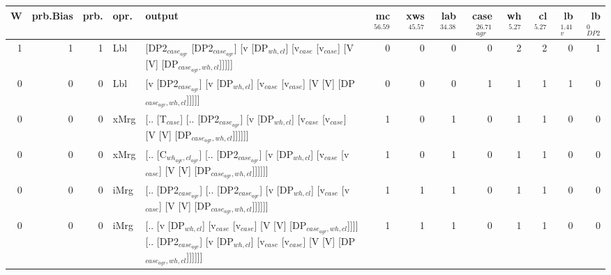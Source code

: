 \begin{tabularx}{\linewidth}{rrrlXrrrrrrrr}
\hline
   W &   prb.Bias &   prb. & opr.   & output                                                                                                                                             &   mc$^{56.59}$ &   xws$^{45.57}$ &   lab$^{34.38}$ &   case$_{agr}^{26.71}$ &   wh$^{5.27}$ &   cl$^{5.27}$ &   lb$_{v}^{1.41}$ &   lb$_{DP2}^{0}$ \\
\hline
   1 &       1 &   1 & Lbl  & [DP2$_{case_{agr}}$ [DP2$_{case_{agr}}$] [v [DP$_{wh,cl}$] [v$_{case}$ [v$_{case}$] [V [V] [DP$_{case_{agr},wh,cl}$]]]]]                                                         &            0 &             0 &             0 &                  0 &           2 &           2 &             0 &            1 \\
   0 &       0 &   0 & Lbl  & [v [DP2$_{case_{agr}}$] [v [DP$_{wh,cl}$] [v$_{case}$ [v$_{case}$] [V [V] [DP$_{case_{agr},wh,cl}$]]]]]                                                                    &            0 &             0 &             0 &                  1 &           1 &           1 &             1 &            0 \\
   0 &       0 &   0 & xMrg & [.. [T$_{case}$] [.. [DP2$_{case_{agr}}$] [v [DP$_{wh,cl}$] [v$_{case}$ [v$_{case}$] [V [V] [DP$_{case_{agr},wh,cl}$]]]]]]                                                     &            1 &             0 &             1 &                  0 &           1 &           1 &             0 &            0 \\
   0 &       0 &   0 & xMrg & [.. [C$_{wh_{agr},cl_{agr}}$] [.. [DP2$_{case_{agr}}$] [v [DP$_{wh,cl}$] [v$_{case}$ [v$_{case}$] [V [V] [DP$_{case_{agr},wh,cl}$]]]]]]                                            &            1 &             0 &             1 &                  0 &           1 &           1 &             0 &            0 \\
   0 &       0 &   0 & iMrg & [.. [DP2$_{case_{agr}}$] [.. [DP2$_{case_{agr}}$] [v [DP$_{wh,cl}$] [v$_{case}$ [v$_{case}$] [V [V] [DP$_{case_{agr},wh,cl}$]]]]]]                                               &            1 &             1 &             1 &                  0 &           1 &           1 &             0 &            0 \\
   0 &       0 &   0 & iMrg & [.. [v [DP$_{wh,cl}$] [v$_{case}$ [v$_{case}$] [V [V] [DP$_{case_{agr},wh,cl}$]]]] [.. [DP2$_{case_{agr}}$] [v [DP$_{wh,cl}$] [v$_{case}$ [v$_{case}$] [V [V] [DP$_{case_{agr},wh,cl}$]]]]]] &            1 &             1 &             1 &                  0 &           1 &           1 &             0 &            0 \\

\end{tabularx}
